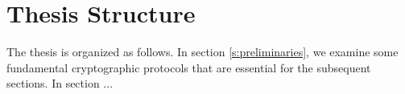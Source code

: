



\section{Thesis Structure}\label{s:thesis-structure}
The thesis is organized as follows.
In section \ref{s:preliminaries}, we examine some fundamental cryptographic protocols that are essential for the subsequent sections.
In section ...



